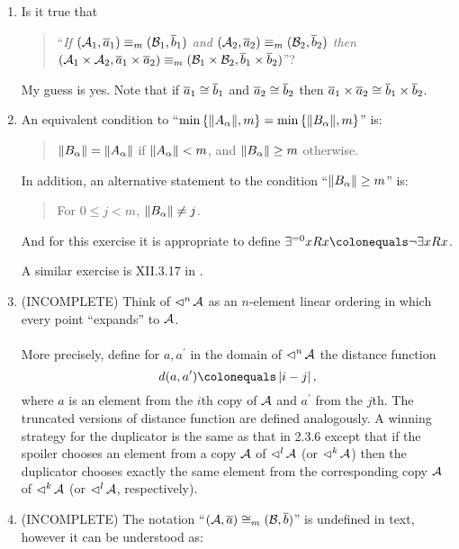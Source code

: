 \begin{enumerate}[1.]
%
\item {} Is it true that
\begin{quote}
``\emph{If $(\strct{A}_1, \vect{a}_1) \equv[m] (\strct{B}_1, \vect{b}_1)$ and $(\strct{A}_2, \vect{a}_2) \equv[m] (\strct{B}_2, \vect{b}_2)$ then $(\strct{A}_1 \cart \strct{A}_2, \vect{a}_1 \cart \vect{a}_2) \equv[m] (\strct{B}_1 \cart \strct{B}_2, \vect{b}_1 \cart \vect{b}_2)$}''?
\end{quote}
My guess is yes. Note that if $\vect{a}_1 \isom \vect{b}_1$ and $\vect{a}_2 \isom \vect{b}_2$ then $\vect{a}_1 \cart \vect{a}_2 \isom \vect{b}_1 \cart \vect{b}_2$.
%
\item {} An equivalent condition to ``$\min{\{\|A_\alpha\|, m\}} = \min{\{\|B_\alpha\|, m\}}$'' is:
\begin{quote}
$\|B_\alpha\| = \|A_\alpha\|$ if $\|A_\alpha\| < m$, and $\|B_\alpha\| \geq m$ otherwise.
\end{quote}
In addition, an alternative statement to the condition ``$\|B_\alpha\| \geq m$'' is:
\begin{quote}
For $0 \leq j < m$, $\|B_\alpha\| \neq j$.
\end{quote}
And for this exercise it is appropriate to define $\existexactly{0}x Rx \defas \neg\exists x Rx$.
\begin{remark}
A similar exercise is XII.3.17 in \cite{EFT}.
\end{remark}
%
\item {} (INCOMPLETE)
Think of $\mathop{\lhd}^n \mathcal{A}$ as an $n$-element linear ordering in which every point ``expands'' to $\mathcal{A}$.\\
\medskip\\
More precisely, define for $a, a^\prime$ in the domain of $\mathop{\lhd}^n \mathcal{A}$ the distance function
\[
\dist{a}{a^\prime} \defas \abs{i - j},
\]
where $a$ is an element from the $i$th copy of $\mathcal{A}$ and $a^\prime$ from the $j$th. The truncated versions of distance function are defined analogously. A winning strategy for the duplicator is the same as that in 2.3.6 except that if the spoiler chooses an element from a copy $\mathcal{A}$ of $\mathop{\lhd}^l \mathcal{A}$ (or $\mathop{\lhd}^k \mathcal{A}$) then the duplicator chooses exactly the same element from the corresponding copy $\mathcal{A}$ of $\mathop{\lhd}^k \mathcal{A}$ (or $\mathop{\lhd}^l \mathcal{A}$, respectively).
%
\item {} (INCOMPLETE)
The notation ``$(\strct{A}, \vect{a}) \isom[m] (\strct{B}, \vect{b})$'' is undefined in text, however it can be understood as:

\end{enumerate}
